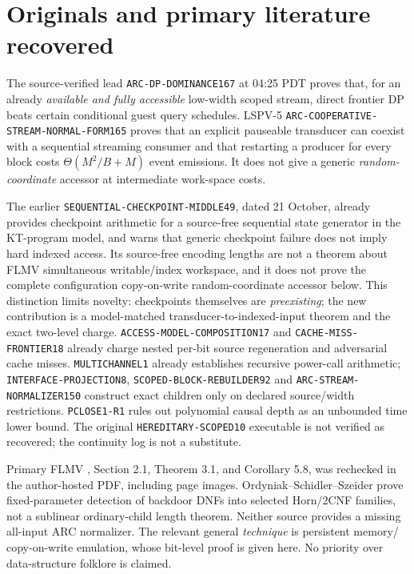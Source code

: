 \documentclass[11pt]{article}
\begin{document}
\section{Originals and primary literature recovered}
The source-verified lead \texttt{ARC-DP-DOMINANCE167} at 04:25 PDT proves
that, for an already \emph{available and fully accessible} low-width scoped
stream, direct frontier DP beats certain conditional guest query schedules.
LSPV-5 \texttt{ARC-COOPERATIVE-STREAM-NORMAL-FORM165} proves that an explicit
pauseable transducer can coexist with a sequential streaming consumer and
that restarting a producer for every block costs
$\Theta(M^2/B+M)$ event emissions. It does not give a generic
\emph{random-coordinate} accessor at intermediate work-space costs.

The earlier \texttt{SEQUENTIAL-CHECKPOINT-MIDDLE49}, dated 21 October,
already provides checkpoint arithmetic for a source-free sequential state
generator in the KT-program model, and warns that generic checkpoint failure
does not imply hard indexed access. Its source-free encoding lengths are
not a theorem about FLMV simultaneous writable/index workspace, and it
does not prove the complete configuration copy-on-write random-coordinate
accessor below. This distinction limits novelty: checkpoints themselves
are \emph{preexisting}; the new contribution is a model-matched
transducer-to-indexed-input theorem and the exact two-level charge.
\texttt{ACCESS-MODEL-COMPOSITION17} and \texttt{CACHE-MISS-FRONTIER18}
already charge nested per-bit source regeneration and adversarial cache
misses. \texttt{MULTICHANNEL1} already establishes recursive power-call
arithmetic; \texttt{INTERFACE-PROJECTION8},
\texttt{SCOPED-BLOCK-REBUILDER92} and \texttt{ARC-STREAM-NORMALIZER150}
construct exact children only on declared source/width restrictions.
\texttt{PCLOSE1-R1} rules out polynomial causal depth as an unbounded
time lower bound. The original \texttt{HEREDITARY-SCOPED10}
executable is not verified as recovered; the continuity log is not a substitute.

Primary FLMV \cite{FLMV}, Section 2.1, Theorem 3.1, and Corollary 5.8,
was rechecked in the author-hosted PDF, including page images.
Ordyniak--Schidler--Szeider \cite{BackdoorDNF}
prove fixed-parameter detection of backdoor DNFs into selected
Horn/2CNF families, not a sublinear ordinary-child length theorem.
Neither source provides a missing all-input ARC normalizer.
The relevant general \emph{technique} is persistent memory/
copy-on-write emulation, whose bit-level proof is given here.
No priority over data-structure folklore is claimed.
\end{document}
